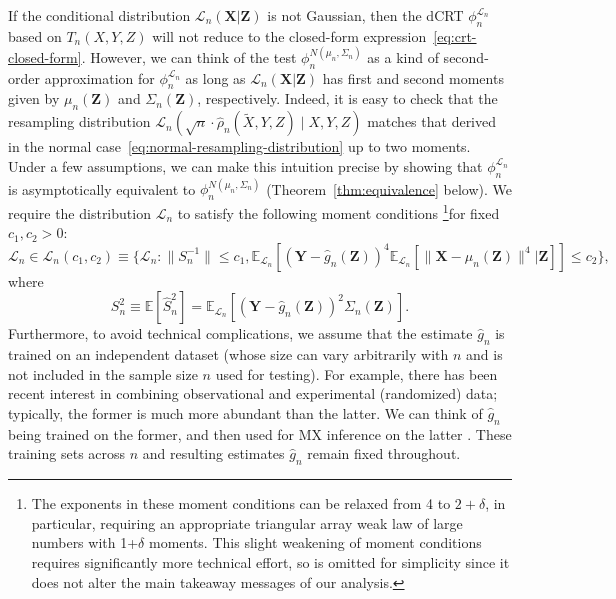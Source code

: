 \documentclass[12pt]{article}
\theoremstyle{definition}
\theoremstyle{remark}
\newcommand{\prx}{\bm X}
\newcommand{\srx}{X}
\newcommand{\prz}{\bm Z}
\newcommand{\srz}{Z}
\newcommand{\srxk}{\widetilde X}
\newcommand{\pry}{{\bm Y}}
\newcommand{\sry}{Y}
\begin{document}
If the conditional distribution $\mathcal L_n(\prx|\prz)$ is not Gaussian, then the dCRT $\phi_n^{\mathcal L_n}$ based on $T_n(\srx, \sry, \srz)$ will not reduce to the closed-form expression~\eqref{eq:crt-closed-form}. However, we can think of the test $\phi^{N(\mu_n, \Sigma_n)}_n$ as a kind of second-order approximation for $\phi_n^{\mathcal L_n}$ as long as $\mathcal L_n(\prx|\prz)$ has first and second moments given by $\mu_n(\prz)$ and $\Sigma_n(\prz)$, respectively. Indeed, it is easy to check that the resampling distribution $\mathcal L_n(\sqrt n \cdot \widehat \rho_n(\srxk, \sry, \srz) \mid \srx, \sry, \srz)$ matches that derived in the normal case~\eqref{eq:normal-resampling-distribution} up to two moments. Under a few assumptions, we can make this intuition precise by showing that $\phi_n^{\mathcal L_n}$ is asymptotically equivalent to $\phi^{N(\mu_n, \Sigma_n)}_n$ (Theorem~\ref{thm:equivalence} below). We require the distribution $\mathcal L_n$ to satisfy the following moment conditions \footnote{The exponents in these moment conditions can be relaxed from 4 to $2+\delta$, in particular, requiring an appropriate triangular array weak law of large numbers with 1+$\delta$ moments. This slight weakening of moment conditions requires significantly more technical effort, so is omitted for simplicity since it does not alter the main takeaway messages of our analysis.}for fixed $c_1, c_2 > 0$:
\small
\begin{equation}
\mathcal L_n \in \mathscr L_n(c_1, c_2) \equiv \{\mathcal L_n: \|S_{n}^{-1}\| \leq c_1, \mathbb E_{\mathcal L_n}\left[(\pry - \widehat g_n(\prz))^{4} \mathbb E_{\mathcal L_n}[\|\prx - \mu_n(\prz)\|^{4}|\prz]\right] \leq c_2 \},
\label{eq:moment-conditions}
\end{equation} 
\normalsize
where
\begin{equation}
S_n^2 \equiv \mathbb E[\widehat S_n^2] = \mathbb E_{\mathcal L_n}\left[(\pry - \widehat g_n(\prz))^2 \Sigma_n(\prz)\right].
\end{equation}
Furthermore, to avoid technical complications, we assume that the estimate $\widehat g_n$ is trained on an independent dataset (whose size can vary arbitrarily with $n$ and is not included in the sample size $n$ used for testing). For example, there has been recent interest in combining observational and experimental (randomized) data; typically, the former is much more abundant than the latter. We can think of $\widehat g_n$ being trained on the former, and then used for MX inference on the latter \cite{Bates2020}.
These training sets across $n$ and resulting estimates $\widehat g_n$ remain fixed throughout.
\end{document}
